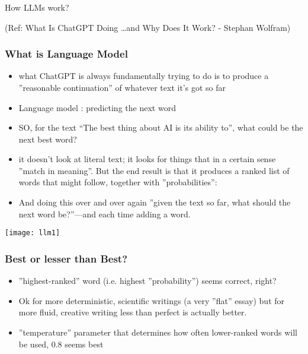 \begin{frame}[fragile]\frametitle{}
\begin{center}
{\Large How LLMs work?}

{\tiny (Ref: What Is ChatGPT Doing \ldots and Why Does It Work? - Stephan Wolfram)}

\end{center}
\end{frame}


\begin{frame}[fragile]\frametitle{What is Language Model}

\begin{itemize}
\item what ChatGPT is always fundamentally trying to do is to produce a ''reasonable continuation'' of whatever text it's got so far
\item Language model : predicting the next word
\item SO, for the text ``The best thing about AI is its ability to'', what could be the next best word?
\item  it doesn’t look at literal text; it looks for things that in a certain sense ''match in meaning''. But the end result is that it produces a ranked list of words that might follow, together with ''probabilities'':
\item And doing this over and over again ''given the text so far, what should the next word be?''—and each time adding a word.
\end{itemize}	

\begin{center}
\texttt{[image: llm1]}
\end{center}

\end{frame}

\begin{frame}[fragile]\frametitle{Best or lesser than Best?}

\begin{itemize}
\item  ''highest-ranked'' word (i.e. highest ''probability'') seems correct, right?
\item  Ok for more deterministic, scientific writings (a very ''flat'' essay) but for more fluid, creative writing less than perfect is actually better.
\item  ''temperature'' parameter that determines how often lower-ranked words will be used, 0.8 seems best
\end{itemize}	


\end{frame}


